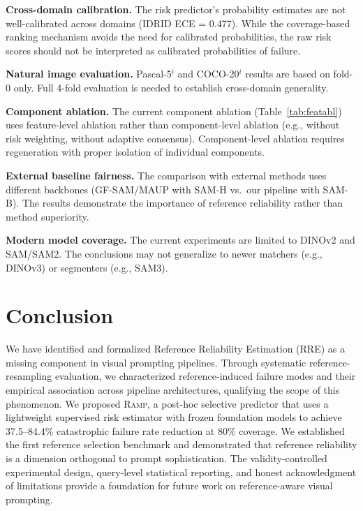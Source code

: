 \documentclass[11pt]{article}
\newcommand{\RAMP}{\textsc{Ramp}}
\begin{document}
\textbf{Cross-domain calibration.} The risk predictor's probability
estimates are not well-calibrated across domains (IDRID ECE = 0.477). While
the coverage-based ranking mechanism avoids the need for calibrated
probabilities, the raw risk scores should not be interpreted as calibrated
probabilities of failure.

\textbf{Natural image evaluation.} Pascal-5$^i$ and COCO-20$^i$ results are
based on fold-0 only. Full 4-fold evaluation is needed to establish
cross-domain generality.

\textbf{Component ablation.} The current component ablation (Table~\ref{tab:featabl})
uses feature-level ablation rather than component-level ablation (e.g.,
without risk weighting, without adaptive consensus). Component-level
ablation requires regeneration with proper isolation of individual
components.

\textbf{External baseline fairness.} The comparison with external methods
uses different backbones (GF-SAM/MAUP with SAM-H vs.\ our pipeline with
SAM-B). The results demonstrate the importance of reference reliability
rather than method superiority.

\textbf{Modern model coverage.} The current experiments are limited to
DINOv2 and SAM/SAM2. The conclusions may not generalize to newer matchers
(e.g., DINOv3) or segmenters (e.g., SAM3).

\section{Conclusion}

We have identified and formalized Reference Reliability Estimation (RRE) as
a missing component in visual prompting pipelines. Through systematic
reference-resampling evaluation, we characterized reference-induced
failure modes and their empirical association across pipeline architectures,
qualifying the scope of this phenomenon. We proposed \RAMP{}, a post-hoc
selective predictor that uses a lightweight supervised risk estimator with
frozen foundation models to achieve 37.5--84.4\% catastrophic failure rate
reduction at 80\% coverage. We established the first reference selection
benchmark and demonstrated that reference reliability is a dimension
orthogonal to prompt sophistication. The validity-controlled experimental
design, query-level statistical reporting, and honest acknowledgment of
limitations provide a foundation for future work on reference-aware visual
prompting.
\end{document}
